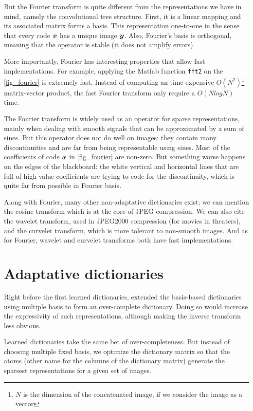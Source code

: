 But the Fourier transform is quite different from the representations we have in mind, namely the convolutional tree structure. First, it is a linear mapping and its associated matrix forms a basis. This representation one-to-one in the sense that every code $\bm x$ has a unique image $\bm{y}$. Also, Fourier's basis is orthogonal, meaning that the operator is stable (it does not amplify errors). %

More importantly, Fourier has interesting properties that allow fast implementations. For example, applying the Matlab function \texttt{fft2} on the \cref{fig_fourier} is extremely fast. Instead of computing an time-expensive $O(N^2)$\footnote{$N$ is the dimension of the concatenated image, if we consider the image as a vector} matrix-vector product, the fast Fourier transform only require a $O(NlogN)$ time.

The Fourier transform is widely used as an operator for sparse representations, mainly when dealing with smooth signals that can be approximated by a sum of sines. But this operator does not do well on images: they contain many discontinuities and are far from being representable using sines. Most of the coefficients of code $\bm x$ in \cref{fig_fourier} are non-zero. But something worse happens on the edges of the blackboard: the white vertical and horizontal lines that are full of high-value coefficients are trying to code for the discontinuity, which is quite far from possible in Fourier basis.

Along with Fourier, many other non-adaptative dictionaries exist; we can mention the cosine transform which is at the core of JPEG compression. We can also cite the wavelet transform, used in JPEG2000 compression (for movies in theaters), and the curvelet transform, which is more tolerant to non-smooth images. And as for Fourier, wavelet and curvelet transforms both have fast implementations.


\section{Adaptative dictionaries}
Right before the first learned dictionaries, \cite{chen_atomic_2001} extended the basis-based dictionaries using multiple basis to form an over-complete dictionary. Doing so would increase the expressivity of such representations, although making the inverse transform less obvious. %

Learned dictionaries take the same bet of over-completeness. But instead of choosing multiple fixed basis, we optimize the dictionary matrix so that the atoms (other name for the columns of the dictionary matrix) generate the sparsest representations for a given set of images.

